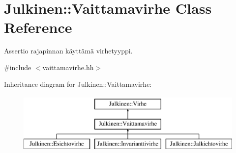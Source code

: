 \hypertarget{class_julkinen_1_1_vaittamavirhe}{}\section{Julkinen\+:\+:Vaittamavirhe Class Reference}
\label{class_julkinen_1_1_vaittamavirhe}


Assertio rajapinnan käyttämä virhetyyppi.  




{\ttfamily \#include $<$vaittamavirhe.\+hh$>$}

Inheritance diagram for Julkinen\+:\+:Vaittamavirhe\+:\begin{figure}[H]
\begin{center}
\leavevmode
\includegraphics[height=3.000000cm]{class_julkinen_1_1_vaittamavirhe}
\end{center}
\end{figure}
